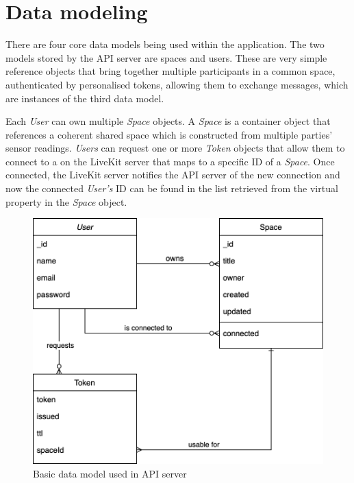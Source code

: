 \section{Data modeling}
\label{sec:datamodeling}

There are four core data models being used within the application.
The two models stored by the \ac{API} server are spaces and users.
These are very simple reference objects that bring together multiple participants in a common space, authenticated by personalised tokens, allowing them to exchange messages, which are instances of the third data model.

Each \emph{User} can own multiple \emph{Space} objects.
A \emph{Space} is a container object that references a coherent shared space which is constructed from multiple parties' sensor readings.
\emph{Users} can request one or more \emph{Token} objects that allow them to connect to a  on the LiveKit server that maps to a specific ID of a \emph{Space}.
Once connected, the LiveKit server notifies the \ac{API} server of the new connection and now the connected \emph{User's} ID can be found in the list retrieved from the virtual  property in the \emph{Space} object.

\begin{figure}[h]
\centering
\includegraphics[scale=0.4]{04_Artefakte/01_Abbildungen/api-datamodel}
\caption[API data model]{Basic data model used in API server\protect}
\label{fig:apiDataModel}
\end{figure}

